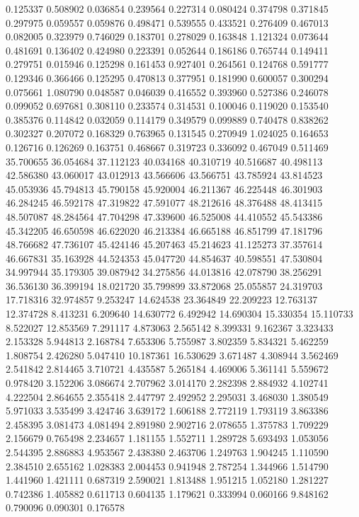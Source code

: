 0.125337
0.508902
0.036854
0.239564
0.227314
0.080424
0.374798
0.371845
0.297975
0.059557
0.059876
0.498471
0.539555
0.433521
0.276409
0.467013
0.082005
0.323979
0.746029
0.183701
0.278029
0.163848
1.121324
0.073644
0.481691
0.136402
0.424980
0.223391
0.052644
0.186186
0.765744
0.149411
0.279751
0.015946
0.125298
0.161453
0.927401
0.264561
0.124768
0.591777
0.129346
0.366466
0.125295
0.470813
0.377951
0.181990
0.600057
0.300294
0.075661
1.080790
0.048587
0.046039
0.416552
0.393960
0.527386
0.246078
0.099052
0.697681
0.308110
0.233574
0.314531
0.100046
0.119020
0.153540
0.385376
0.114842
0.032059
0.114179
0.349579
0.099889
0.740478
0.838262
0.302327
0.207072
0.168329
0.763965
0.131545
0.270949
1.024025
0.164653
0.126716
0.126269
0.163751
0.468667
0.319723
0.336092
0.467049
0.511469
35.700655
36.054684
37.112123
40.034168
40.310719
40.516687
40.498113
42.586380
43.060017
43.012913
43.566606
43.566751
43.785924
43.814523
45.053936
45.794813
45.790158
45.920004
46.211367
46.225448
46.301903
46.284245
46.592178
47.319822
47.591077
48.212616
48.376488
48.413415
48.507087
48.284564
47.704298
47.339600
46.525008
44.410552
45.543386
45.342205
46.650598
46.622020
46.213384
46.665188
46.851799
47.181796
48.766682
47.736107
45.424146
45.207463
45.214623
41.125273
37.357614
46.667831
35.163928
44.524353
45.047720
44.854637
40.598551
47.530804
34.997944
35.179305
39.087942
34.275856
44.013816
42.078790
38.256291
36.536130
36.399194
18.021720
35.799899
33.872068
25.055857
24.319703
17.718316
32.974857
9.253247
14.624538
23.364849
22.209223
12.763137
12.374728
8.413231
6.209640
14.630772
6.492942
14.690304
15.330354
15.110733
8.522027
12.853569
7.291117
4.873063
2.565142
8.399331
9.162367
3.323433
2.153328
5.944813
2.168784
7.653306
5.755987
3.802359
5.834321
5.462259
1.808754
2.426280
5.047410
10.187361
16.530629
3.671487
4.308944
3.562469
2.541842
2.814465
3.710721
4.435587
5.265184
4.469006
5.361141
5.559672
0.978420
3.152206
3.086674
2.707962
3.014170
2.282398
2.884932
4.102741
4.222504
2.864655
2.355418
2.447797
2.492952
2.295031
3.468030
1.380549
5.971033
3.535499
3.424746
3.639172
1.606188
2.772119
1.793119
3.863386
2.458395
3.081473
4.081494
2.891980
2.902716
2.078655
1.375783
1.709229
2.156679
0.765498
2.234657
1.181155
1.552711
1.289728
5.693493
1.053056
2.544395
2.886883
4.953567
2.438380
2.463706
1.249763
1.904245
1.110590
2.384510
2.655162
1.028383
2.004453
0.941948
2.787254
1.344966
1.514790
1.441960
1.421111
0.687319
2.590021
1.813488
1.951215
1.052180
1.281227
0.742386
1.405882
0.611713
0.604135
1.179621
0.333994
0.060166
9.848162
0.790096
0.090301
0.176578
